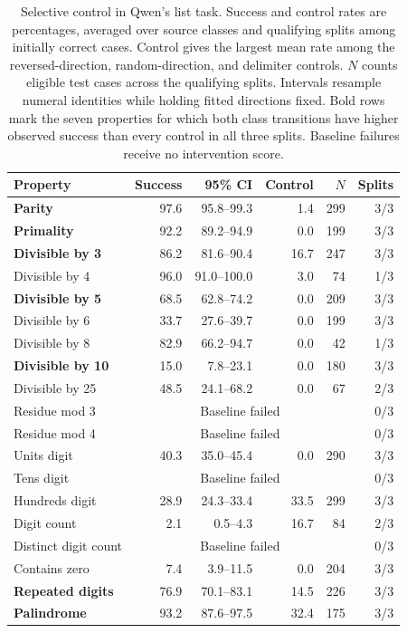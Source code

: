 \documentclass[11pt]{article}
\begin{document}
\begin{table}[t]
\centering
\fontsize{8.2}{9.5}\selectfont
\setlength{\tabcolsep}{2pt}
\begin{tabular}{@{}lrrrrr@{}}
\toprule
Property & Success & 95\% CI & Control & $N$ & Splits \\
\midrule
\textbf{Parity} & 97.6 & 95.8--99.3 & 1.4 & 299 & 3/3 \\
\textbf{Primality} & 92.2 & 89.2--94.9 & 0.0 & 199 & 3/3 \\
\textbf{Divisible by 3} & 86.2 & 81.6--90.4 & 16.7 & 247 & 3/3 \\
Divisible by 4 & 96.0 & 91.0--100.0 & 3.0 & 74 & 1/3 \\
\textbf{Divisible by 5} & 68.5 & 62.8--74.2 & 0.0 & 209 & 3/3 \\
Divisible by 6 & 33.7 & 27.6--39.7 & 0.0 & 199 & 3/3 \\
Divisible by 8 & 82.9 & 66.2--94.7 & 0.0 & 42 & 1/3 \\
\textbf{Divisible by 10} & 15.0 & 7.8--23.1 & 0.0 & 180 & 3/3 \\
Divisible by 25 & 48.5 & 24.1--68.2 & 0.0 & 67 & 2/3 \\
Residue mod 3 & \multicolumn{4}{c}{Baseline failed} & 0/3 \\
Residue mod 4 & \multicolumn{4}{c}{Baseline failed} & 0/3 \\
Units digit & 40.3 & 35.0--45.4 & 0.0 & 290 & 3/3 \\
Tens digit & \multicolumn{4}{c}{Baseline failed} & 0/3 \\
Hundreds digit & 28.9 & 24.3--33.4 & 33.5 & 299 & 3/3 \\
Digit count & 2.1 & 0.5--4.3 & 16.7 & 84 & 2/3 \\
Distinct digit count & \multicolumn{4}{c}{Baseline failed} & 0/3 \\
Contains zero & 7.4 & 3.9--11.5 & 0.0 & 204 & 3/3 \\
\textbf{Repeated digits} & 76.9 & 70.1--83.1 & 14.5 & 226 & 3/3 \\
\textbf{Palindrome} & 93.2 & 87.6--97.5 & 32.4 & 175 & 3/3 \\
\bottomrule
\end{tabular}
\caption{Selective control in Qwen's list task.
Success and control rates are percentages, averaged over source classes and qualifying splits among initially correct cases.
Control gives the largest mean rate among the reversed-direction, random-direction, and delimiter controls.
$N$ counts eligible test cases across the qualifying splits.
Intervals resample numeral identities while holding fitted directions fixed.
Bold rows mark the seven properties for which both class transitions have higher observed success than every control in all three splits.
Baseline failures receive no intervention score.}
\label{tab:individual-property-control}
\end{table}
\end{document}
